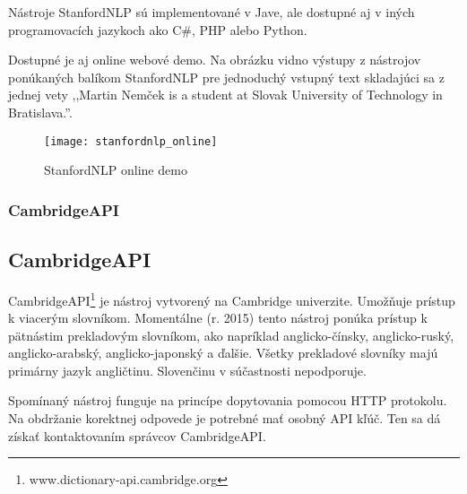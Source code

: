 Nástroje StanfordNLP sú implementované v Jave, ale dostupné aj v iných programovacích jazykoch ako C\#, PHP alebo Python.

Dostupné je aj online webové demo. Na obrázku  vidno výstupy z nástrojov ponúkaných balíkom StanfordNLP pre jednoduchý vstupný text skladajúci sa z jednej vety ,,Martin Nemček is a student at Slovak University of Technology in Bratislava.''.

\begin{figure}[H]
\begin{center}\texttt{[image: stanfordnlp\_online]}\end{center}
\caption[StanfordNLP online demo]{StanfordNLP online demo}\label{fig:stanfordnlp_online_demo}
\end{figure}

%
%
{
	\subsubsection{CambridgeAPI}
}
{
	\subsection{CambridgeAPI}
}
\label{subsubsec:cambridgeapi}
CambridgeAPI\footnote{www.dictionary-api.cambridge.org} je nástroj vytvorený na Cambridge univerzite. Umožňuje prístup k viacerým slovníkom. Momentálne (r. 2015) tento nástroj ponúka prístup k pätnástim prekladovým slovníkom, ako napríklad anglicko-čínsky, anglicko-ruský, anglicko-arabský, anglicko-japonský a ďalšie. Všetky prekladové slovníky majú primárny jazyk angličtinu. Slovenčinu v súčastnosti nepodporuje.

Spomínaný nástroj funguje na princípe dopytovania pomocou HTTP protokolu. Na obdržanie korektnej odpovede je potrebné mať osobný API kľúč. Ten sa dá získať kontaktovaním správcov CambridgeAPI.

